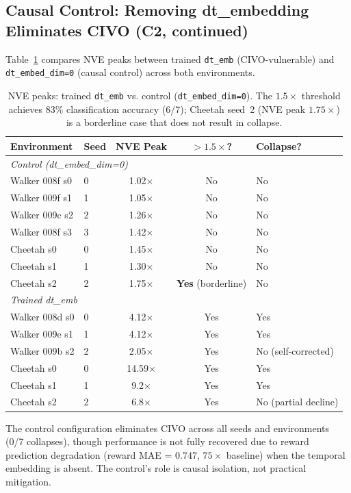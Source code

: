 \documentclass[10pt,letterpaper]{article}
\begin{document}
\subsection{Causal Control: Removing dt\_embedding Eliminates CIVO (C2, continued)}

Table~\ref{tab:control_nve} compares NVE peaks between trained \texttt{dt\_emb} (CIVO-vulnerable) and \texttt{dt\_embed\_dim=0} (causal control) across both environments.

\begin{table}[h]
\centering
\caption{NVE peaks: trained \texttt{dt\_emb} vs. control (\texttt{dt\_embed\_dim=0}). The $1.5\times$ threshold achieves 83\% classification accuracy (6/7); Cheetah seed~2 (NVE peak $1.75\times$) is a borderline case that does not result in collapse.}
\label{tab:control_nve}
\begin{tabular}{llccl}
\toprule
Environment & Seed & NVE Peak & $>1.5\times$? & Collapse? \\
\midrule
\multicolumn{5}{l}{\emph{Control (dt\_embed\_dim=0)}} \\
Walker 008f s0 & 0 & 1.02$\times$ & No & No \\
Walker 009f s1 & 1 & 1.05$\times$ & No & No \\
Walker 009c s2 & 2 & 1.26$\times$ & No & No \\
Walker 008f s3 & 3 & 1.42$\times$ & No & No \\
Cheetah s0 & 0 & 1.45$\times$ & No & No \\
Cheetah s1 & 1 & 1.30$\times$ & No & No \\
Cheetah s2 & 2 & 1.75$\times$ & \textbf{Yes} (borderline) & No \\
\midrule
\multicolumn{5}{l}{\emph{Trained dt\_emb}} \\
Walker 008d s0 & 0 & 4.12$\times$ & Yes & Yes \\
Walker 009e s1 & 1 & 4.12$\times$ & Yes & Yes \\
Walker 009b s2 & 2 & 2.05$\times$ & Yes & No (self-corrected) \\
Cheetah s0 & 0 & 14.59$\times$ & Yes & Yes \\
Cheetah s1 & 1 & 9.2$\times$ & Yes & Yes \\
Cheetah s2 & 2 & 6.8$\times$ & Yes & No (partial decline) \\
\bottomrule
\end{tabular}
\end{table}

The control configuration eliminates CIVO across all seeds and environments (0/7 collapses), though performance is not fully recovered due to reward prediction degradation (reward MAE = $0.747$, $75\times$ baseline) when the temporal embedding is absent.
The control's role is causal isolation, not practical mitigation.
\end{document}
